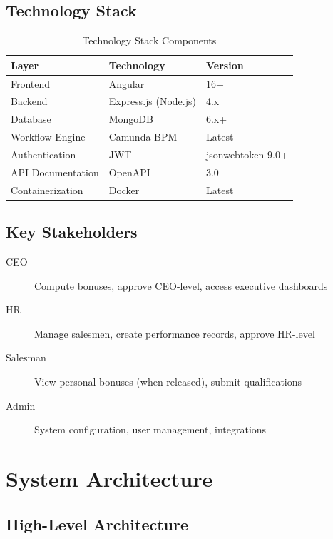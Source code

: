 \documentclass[11pt,a4paper,oneside,openany]{book}
\begin{document}
\section{Technology Stack}

\begin{table}[H]
\centering
\begin{tabular}{lll}
\toprule
\textbf{Layer} & \textbf{Technology} & \textbf{Version} \\
\midrule
Frontend & Angular & 16+ \\
Backend & Express.js (Node.js) & 4.x \\
Database & MongoDB & 6.x+ \\
Workflow Engine & Camunda BPM & Latest \\
Authentication & JWT & jsonwebtoken 9.0+ \\
API Documentation & OpenAPI & 3.0 \\
Containerization & Docker & Latest \\
\bottomrule
\end{tabular}
\caption{Technology Stack Components}
\label{tab:techstack}
\end{table}

\section{Key Stakeholders}

\begin{tcolorbox}[colback=background,colframe=darkblue,title=Supported Roles]
\begin{description}
    \item[CEO] Compute bonuses, approve CEO-level, access executive dashboards
    \item[HR] Manage salesmen, create performance records, approve HR-level
    \item[Salesman] View personal bonuses (when released), submit qualifications
    \item[Admin] System configuration, user management, integrations
\end{description}
\end{tcolorbox}

\chapter{System Architecture}

\section{High-Level Architecture}
\end{document}
